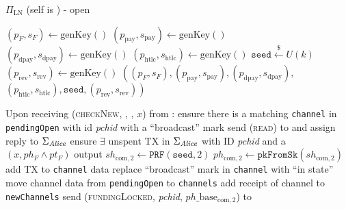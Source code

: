 \begin{protocolbox}{$\Pi_{\mathrm{LN}}$ (self is \alice) - open}
\begin{algorithmic}[1]
     
      \State $\left(p_F, s_F\right) \gets \mathrm{genKey}\left(\right)$
      \State $\left(p_{\mathrm{pay}}, s_{\mathrm{pay}}\right) \gets
      \mathrm{genKey}\left(\right)$ 
      \State $\left(p_{\mathrm{dpay}}, s_{\mathrm{dpay}}\right) \gets
      \mathrm{genKey}\left(\right)$ 
      \State $\left(p_{\mathrm{htlc}}, s_{\mathrm{htlc}}\right) \gets
      \mathrm{genKey}\left(\right)$ 
      \State $\texttt{seed} \overset{\$}{\gets} U(k)$ 
      \State $\left(p_{\mathrm{rev}}, s_{\mathrm{rev}}\right) \gets
      \mathrm{genKey}\left(\right)$ 
      \State \Return $\left(\left(p_F, s_F\right), \left(p_{\mathrm{pay}},
      s_{\mathrm{pay}}\right), \left(p_{\mathrm{dpay}},
      s_{\mathrm{dpay}}\right),\right.$
      \Indent
        \State $\left.\left(p_{\mathrm{htlc}}, s_{\mathrm{htlc}}\right),
        \mathtt{seed}, \left(p_{\mathrm{rev}}, s_{\mathrm{rev}}\right)\right)$
      \EndIndent
    \EndFunction
    \State

    \State {}
    \State Upon receiving (\textsc{checkNew}, \alice, \bob, $x$) from
    \environment: 
    \Indent
      \State ensure there is a matching \texttt{channel} in \texttt{pendingOpen}
      with id \textit{pchid} with a ``broadcast'' mark
      \State send (\textsc{read}) to \ledger{} and assign reply to
      $\Sigma_{\mathit{Alice}}$
      \State ensure $\exists$ unspent TX in $\Sigma_{\mathit{Alice}}$ with ID
      \textit{pchid} and a $\left(x, ph_F \wedge pt_F\right)$ output
      \State $sh_{\mathrm{com}, 2} \gets
      \texttt{PRF}\left(\mathtt{seed}, 2\right)$
      \State $ph_{\mathrm{com}, 2} \gets
      \mathtt{pkFromSk}\left(sh_{\mathrm{com}, 2}\right)$
      \State add TX to \texttt{channel} data \State replace ``broadcast'' mark
      in \texttt{channel} with ``in state''
        \State move channel data from \texttt{pendingOpen} to \texttt{channels}
        \State add receipt of channel to \texttt{newChannels}
      \EndIf
      \State send (\textsc{fundingLocked}, \textit{pchid},
      $ph\_\mathrm{base}_{\mathrm{com}, 2}$) to \bob{}
    \EndIndent
    \State


\end{algorithmic}
\end{protocolbox}
